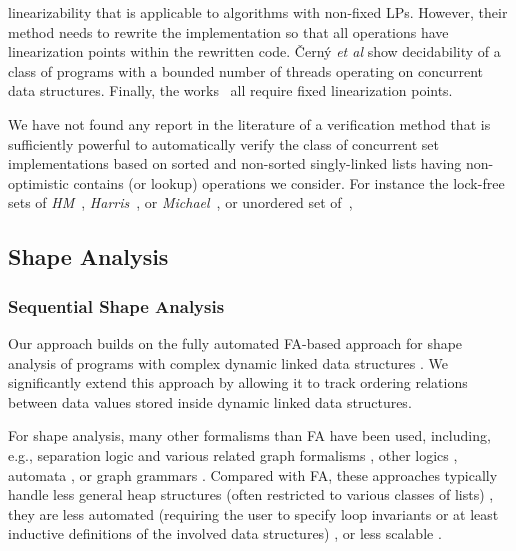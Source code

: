 linearizability that is applicable to algorithms with non-fixed LPs.
%
However, their method needs to rewrite the implementation so that all operations 
have linearization points within the rewritten code.
%
\v{C}ern{\'y} {\it et al} \cite{CernyRZCA:CAV10} show decidability of a class
of programs with a bounded number of threads operating on concurrent data structures.
%
%
Finally, the works~\cite{AHHR:integrated,BLMRS:cav08,Vafeiadis:vmcai09}
all require fixed linearization points.

We have not found any report in the literature of a
verification method that is sufficiently powerful to
automatically verify the class of concurrent set
implementations based on sorted and non-sorted
singly-linked lists having non-optimistic contains (or lookup) operations we consider. For instance %
the lock-free sets of {\it HM}~\cite{ArtOfMpP},
{\it Harris}~\cite{Harris:list}, or {\it Michael}~\cite{Michael:list},
or unordered set of~\cite{Zhang:unorderedlist},


\subsection{Shape Analysis}
\subsubsection{Sequential Shape Analysis}
Our approach builds on the fully automated FA-based
approach for shape analysis of programs with complex dynamic linked data
structures \cite{forester11,boxes13}. We significantly extend this approach by
allowing it to track ordering relations between data values stored inside
dynamic linked data structures. 

For shape analysis, many other formalisms than FA have been used, including,
e.g., separation logic and various related graph formalisms
\cite{InvaderCAV08,thor10,rival11,dudka13}, other logics \cite{Sagiv02,pale97},
automata \cite{artmc12}, or graph grammars \cite{juggrnaut10}. Compared with FA,
these approaches typically handle less general heap structures (often restricted
to various classes of lists) \cite{InvaderCAV08,dudka13}, they are less
automated (requiring the user to specify loop invariants or at least inductive
definitions of the involved data structures)
\cite{thor10,rival11,dudka13,juggrnaut10}, or less scalable \cite{artmc12}.

